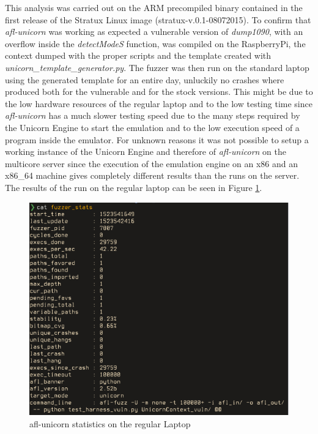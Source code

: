 \documentclass[../main.tex]{subfiles}
\begin{document}
This analysis was carried out on the ARM precompiled binary contained in the
first release of the Stratux Linux image (stratux-v.0.1-08072015).
To confirm that \textit{afl-unicorn} was working as expected a vulnerable
version of \textit{dump1090}, with an overflow inside the \textit{detectModeS}
function, was compiled on the RaspberryPi, the context dumped with the
proper scripts and the template created with \textit{unicorn\_template\_generator.py}. The fuzzer was then run on the standard laptop using the generated template for an entire day, unluckily no crashes where produced both for the vulnerable and for the stock versions. This might be due to the low hardware resources of the regular laptop and to the low testing time since \textit{afl-unicorn} has a much slower testing speed due to the many steps required by the Unicorn Engine to start the emulation and to the low execution speed of a program inside the emulator. For unknown reasons it was not possible to setup a working instance of the Unicorn Engine and therefore of \textit{afl-unicorn} on the multicore server since the execution of the emulation engine on an x86 and an x86\_64 machine gives completely different results than the runs on the server. The results of the run on the regular laptop can be seen in Figure \ref{fig:unistats}.

\begin{figure}[htp]
  \centering
  \includegraphics[scale=0.85]{images/aflunicornstats.png}
  \caption{afl-unicorn statistics on the regular Laptop}
  \label{fig:unistats}
\end{figure}
\end{document}
